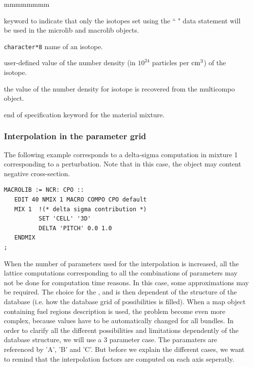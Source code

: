 \begin{ListeDeDescription}{mmmmmmmm}
\item[\moc{ONLY}] keyword to indicate that only the isotopes set using the `` " data statement will be used in the {\sc microlib} and {\sc macrolib} objects.

\item[\dusa{HISO}] {\tt character*8} name of an isotope.

\item[\dusa{conc}] user-defined value of the number density (in $10^{24}$ particles per ${\rm cm}^3$) of the isotope.

\item[\moc{*}] the value of the number density for isotope  is recovered from the {\sc multicompo} object.

\item[\moc{ENDMIX}] end of specification keyword for the material mixture.

\end{ListeDeDescription}


\subsubsection{Interpolation in the parameter grid}


The following example corresponds to a delta-sigma computation in mixture 1 corresponding to a perturbation. Note that in this case, the  object  may content negative cross-section. 
\begin{verbatim}
MACROLIB := NCR: CPO ::
   EDIT 40 NMIX 1 MACRO COMPO CPO default
   MIX 1  !(* delta sigma contribution *)
          SET 'CELL' '3D'
          DELTA 'PITCH' 0.0 1.0
   ENDMIX
;
\end{verbatim}

When the number of parameters used for the interpolation is increased, all the lattice computations corresponding to all the combinations of parameters may not be done for computation time reasons. In this case, some approximations may be required. The choice for the ,  and  is then dependent of the structure of the database (i.e. how the database grid of possibilities is filled). When a {\sc map} object containing fuel regions description is used, the problem become even more complex, because values have to be automatically changed for all bundles. In order to clarify all the different possibilities and limitations dependently of the database structure, we will use a 3 parameter case. The paramaters are referenced by 'A', 'B' and 'C'. But before we explain the different cases, we want to remind that the interpolation factors are computed on each axis seperatly.

